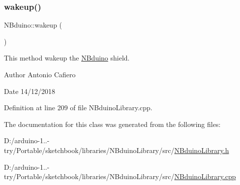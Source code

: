 \mbox{\label{class_n_bduino_a8e740e7b90e6e75b7dd3b7900ee0dd22}} 
\subsubsection{\texorpdfstring{wakeup()}{wakeup()}}
{\footnotesize\ttfamily N\+Bduino\+::wakeup (\begin{DoxyParamCaption}{ }\end{DoxyParamCaption})}

This method wakeup the \mbox{\hyperlink{class_n_bduino}{N\+Bduino}} shield. \begin{DoxyAuthor}{Author}
Antonio Cafiero 
\end{DoxyAuthor}
\begin{DoxyDate}{Date}
14/12/2018 
\end{DoxyDate}


Definition at line 209 of file N\+Bduino\+Library.\+cpp.



The documentation for this class was generated from the following files\+:\begin{DoxyCompactItemize}
\item 
D\+:/arduino-\/1..-\/try/\+Portable/sketchbook/libraries/\+N\+Bduino\+Library/src/\mbox{\hyperlink{_n_bduino_library_8h}{N\+Bduino\+Library.\+h}}\item 
D\+:/arduino-\/1..-\/try/\+Portable/sketchbook/libraries/\+N\+Bduino\+Library/src/\mbox{\hyperlink{_n_bduino_library_8cpp}{N\+Bduino\+Library.\+cpp}}\end{DoxyCompactItemize}
